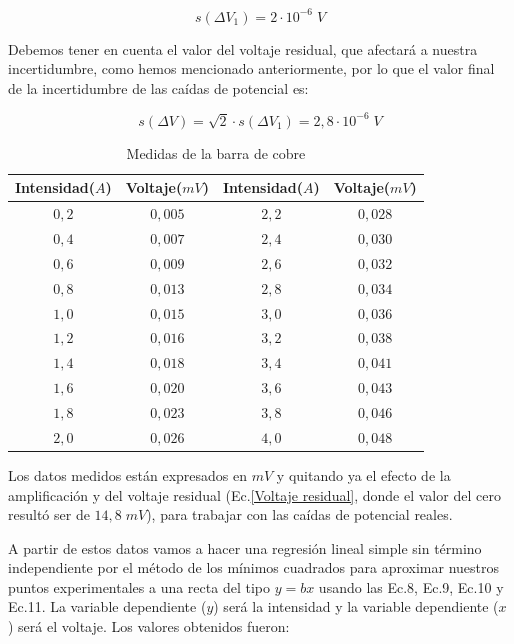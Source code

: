 \documentclass[a4paper,12pt,titlepage]{report}
\begin{document}
\begin{equation}
    s(\Delta V_{1}) = 2 \cdot 10^{-6}\; V
\end{equation}

Debemos tener en cuenta el valor del voltaje residual, que afectará a nuestra incertidumbre, como hemos mencionado anteriormente, por lo que el valor final de la incertidumbre de las caídas de potencial es:

\begin{equation}
    s(\Delta V) = \sqrt{2}\cdot s(\Delta V_{1}) = 2,8 \cdot 10^{-6} \; V
\end{equation}

\bigskip

\begin{table}[h!]
    \centering
    \begin{tabular}{|c|c|c|c|}
        \hline Intensidad($A$) & Voltaje($mV$) & Intensidad($A$) & Voltaje($mV$) \\
        \hline
        $0,2$ & $0,005$ & $2,2$ & $0,028$\\
        \hline
        $0,4$ & $0,007$ & $2,4$ & $0,030$  \\
        \hline
        $0,6$ & $0,009$ & $2,6$ & $0,032$  \\
        \hline
        $0,8$ & $0,013$ & $2,8$ & $0,034$  \\
        \hline
        $1,0$ & $0,015$ & $3,0$ & $0,036$  \\
        \hline
        $1,2$ & $0,016$ & $3,2$ & $0,038$  \\
        \hline
        $1,4$ & $0,018$ & $3,4$ & $0,041$  \\
        \hline
        $1,6$ & $0,020$ & $3,6$ & $0,043$  \\
        \hline
        $1,8$ & $0,023$ & $3,8$ & $0,046$  \\
        \hline
        $2,0$ & $0,026$ & $4,0$ & $0,048$  \\
        \hline
    \end{tabular}
    \caption{Medidas de la barra de cobre}
\end{table}

Los datos medidos están expresados en $mV$ y quitando ya el efecto de la amplificación y del voltaje residual (Ec.\ref{Voltaje residual}, donde el valor del cero resultó ser de $14,8 \; mV$), para trabajar con las caídas de potencial reales.

\par A partir de estos datos vamos a hacer una regresión lineal simple sin término independiente por el método de los mínimos cuadrados para aproximar nuestros puntos experimentales a una recta del tipo $y=bx$ usando las Ec.8, Ec.9, Ec.10 y Ec.11. La variable dependiente ($y$) será la intensidad y la variable dependiente ($x$) será el voltaje. Los valores obtenidos fueron:
\end{document}
